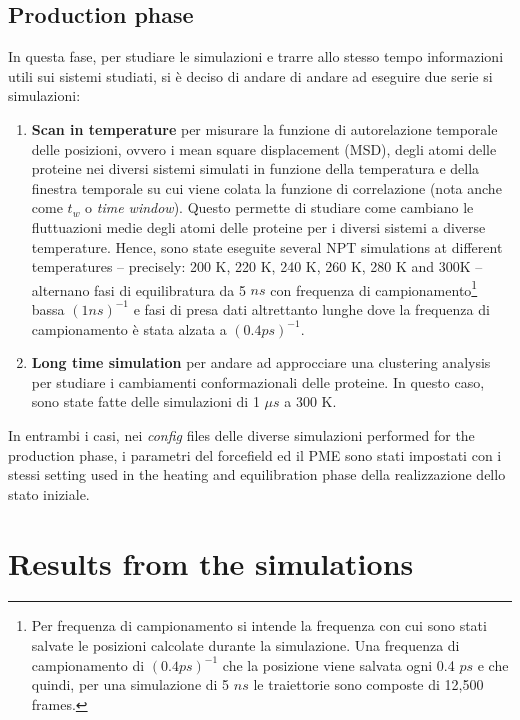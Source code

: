 \subsection{Production phase}
In questa fase, per studiare le simulazioni e trarre allo stesso tempo informazioni utili sui sistemi studiati, si è deciso di andare di andare ad eseguire due serie si simulazioni:
\begin{enumerate}
\item \textbf{Scan in temperature} per misurare la funzione di autorelazione temporale delle posizioni, ovvero i mean square displacement (MSD), degli atomi delle proteine nei diversi sistemi simulati in funzione della temperatura e della finestra temporale su cui viene colata la funzione di correlazione (nota anche come $t_w$ o \textit{time window}). Questo permette di studiare come cambiano le fluttuazioni medie degli atomi delle proteine per i diversi sistemi a diverse temperature. Hence, sono state eseguite several NPT simulations at different temperatures -- precisely: 200 K, 220 K, 240 K, 260 K, 280 K and 300K -- alternano fasi di equilibratura da 5 $ns$ con frequenza di campionamento\footnote{Per frequenza di campionamento si intende la frequenza con cui sono stati salvate le posizioni calcolate durante la simulazione. Una frequenza di campionamento di $(0.4 ps)^{-1}$ che la posizione viene salvata ogni 0.4 $ps$ e che quindi, per una simulazione di 5 $ns$ le traiettorie sono composte di 12,500 frames.} bassa $(1 ns)^{-1}$ e fasi di presa dati altrettanto lunghe dove la frequenza di campionamento è stata alzata a $(0.4 ps)^{-1}$. 
\item \textbf{Long time simulation} per andare ad approcciare una clustering analysis per studiare i cambiamenti conformazionali delle proteine. In questo caso, sono state fatte delle simulazioni di 1 $\mu s$ a 300 K. 
\end{enumerate}
In entrambi i casi, nei \textit{config} files delle diverse simulazioni performed for the production phase, i parametri del forcefield ed il PME sono stati impostati con i stessi setting used in the heating and equilibration phase della realizzazione dello stato iniziale.

\section{Results from the simulations}

